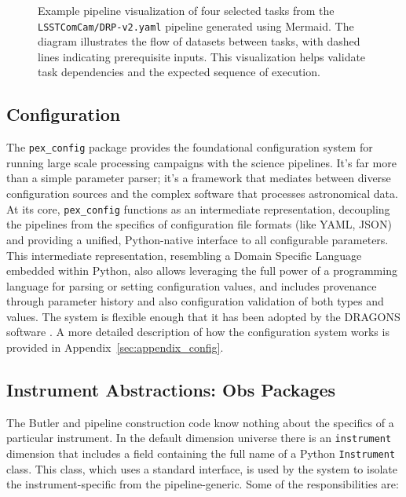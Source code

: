 \begin{figure*}
    \centering
    \caption{
        Example pipeline visualization of four selected tasks from the \texttt{LSSTComCam/DRP-v2.yaml} pipeline generated using Mermaid.
        The diagram illustrates the flow of datasets between tasks, with dashed lines indicating prerequisite inputs.
        This visualization helps validate task dependencies and the expected sequence of execution.
    }
    \label{fig:pipe_viz}
\end{figure*}

\subsection{Configuration}
\label{sec:config}
The \texttt{pex\_config} package provides the foundational configuration system for running large scale processing campaigns with the science pipelines.
It's far more than a simple parameter parser; it's a framework that mediates between diverse configuration sources and the complex software that processes astronomical data.
At its core, \texttt{pex\_config} functions as an intermediate representation, decoupling the pipelines from the specifics of configuration file formats (like YAML, JSON) and providing a unified, Python-native interface to all configurable parameters.
This intermediate representation, resembling a Domain Specific Language embedded within Python, also allows leveraging the full power of a programming language for parsing or setting configuration values, and includes provenance through parameter history and also configuration validation of both types and values.
The system is flexible enough that it has been adopted by the DRAGONS software \citep{2023RNAAS...7..214L}.
A more detailed description of how the configuration system works is provided in Appendix~\ref{sec:appendix_config}.

\subsection{Instrument Abstractions: Obs Packages}
\label{sec:obs_packages}

The Butler and pipeline construction code know nothing about the specifics of a particular instrument.
In the default dimension universe there is an \texttt{instrument} dimension that includes a field containing the full name of a Python \texttt{Instrument} class.
This class, which uses a standard interface, is used by the system to isolate the instrument-specific from the pipeline-generic.
Some of the responsibilities are:

